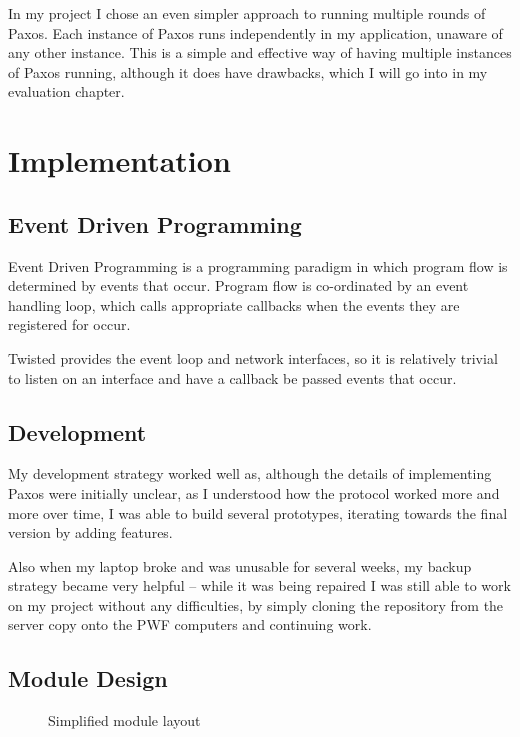 \documentclass[12pt,twoside,notitlepage]{report}
\newcommand{\lwincludegraphics}[2][]{%
  \sbox{0}{\texttt{[image: \#2]}}%
  \ifdim\wd0>\linewidth
    \resizebox{\linewidth}{!}{\box0 }%
  \else
    \leavevmode\box0
  \fi}
\begin{document}
In my project I chose an even simpler approach to running multiple rounds of Paxos. Each instance
of Paxos runs independently in my application, unaware of any other instance. This is a simple and
effective way of having multiple instances of Paxos running, although it does have drawbacks,
which I will go into in my evaluation chapter.


\cleardoublepage
\chapter{Implementation}

\section{Event Driven Programming}

Event Driven Programming is a programming paradigm in which program flow is determined by events
that occur. Program flow is co-ordinated by an event handling loop, which calls appropriate
callbacks when the events they are registered for occur.

Twisted provides the event loop and network interfaces, so it is relatively trivial to listen on
an interface and have a callback be passed events that occur.

\section{Development}

My development strategy worked well as, although the details of implementing Paxos were initially
unclear, as I understood how the protocol worked more and more over time, I was able to build
several prototypes, iterating towards the final version by adding features.

Also when my laptop broke and was unusable for several weeks, my backup strategy became very
helpful -- while it was being repaired I was still able to work on my project without any
difficulties, by simply cloning the repository from the server copy onto the PWF computers and
continuing work.

\section{Module Design}

\begin{figure}[htb]
\centering
\lwincludegraphics[scale=0.5]{figs/module-layout.eps}
\caption{\label{fig:module-layout}Simplified module layout}
\end{figure}
\end{document}

